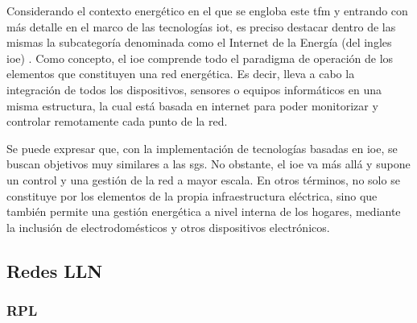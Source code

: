 Considerando el contexto energético en el que se engloba este \gls{tfm} y entrando con más detalle en el marco de las tecnologías \gls{iot}, es preciso destacar dentro de las mismas la subcategoría denominada como el Internet de la Energía (del ingles \gls{ioe}) \cite{ioe}. Como concepto, el \gls{ioe} comprende todo el paradigma de operación de los elementos que constituyen una red energética. Es decir, lleva a cabo la integración de todos los dispositivos, sensores o equipos informáticos en una misma estructura, la cual está basada en internet para poder monitorizar y controlar remotamente cada punto de la red.

\vspace{3mm}

Se puede expresar que, con la implementación de tecnologías basadas en \gls{ioe}, se buscan objetivos muy similares a las \gls{sg}s. No obstante, el \gls{ioe} va más allá y supone un control y una gestión de la red a mayor escala. En otros términos, no solo se constituye por los elementos de la propia infraestructura eléctrica, sino que también permite una gestión energética a nivel interna de los hogares, mediante la inclusión de electrodomésticos y otros dispositivos electrónicos.



\subsection{Redes LLN}


\subsubsection{RPL}
